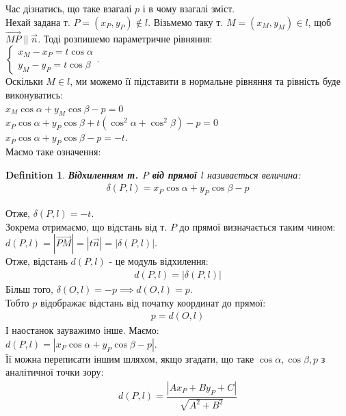 \documentclass[a4paper, 10pt]{extarticle}
\theoremstyle{theoremdd}
\theoremstyle{theoremdd}
\newtheorem{definition}[theorem]{Definition}
\theoremstyle{theoremdd}
\theoremstyle{theoremdd}
\theoremstyle{theoremdd}
\theoremstyle{theoremdd}
\theoremstyle{theoremdd}
\theoremstyle{theoremdd}
\begin{document}
Час дізнатись, що таке взагалі $p$ і в чому взагалі зміст.\\
Нехай задана т. $P = (x_P, y_P) \not \in l$. Візьмемо таку т. $M = (x_M, y_M) \in l$, щоб $\overrightarrow{MP} \parallel \vec{n}$. Тоді розпишемо параметричне рівняння:\\
$\begin{cases}
x_M - x_P = t \cos \alpha\\
y_M - y_P = t \cos \beta
\end{cases}.
$\\
Оскільки $M \in l$, ми можемо її підставити в нормальне рівняння та рівність буде виконуватись:\\
$x_M \cos \alpha + y_M \cos \beta - p = 0$\\
$x_P \cos \alpha + y_P \cos \beta + t(\cos^2 \alpha + \cos^2 \beta) - p = 0$\\
$x_P \cos \alpha + y_P \cos \beta -p = -t$.\\
Маємо таке означення:
\begin{definition}
\textbf{Відхиленням т. $P$ від прямої $l$} називається величина:
\begin{align*}
\delta(P,l) = x_P \cos \alpha + y_P \cos \beta - p
\end{align*}
\end{definition}

Отже, $\delta(P,l)=-t$.\\
Зокрема отримаємо, що відстань від т. $P$ до прямої визначається таким чином:\\
$d(P,l)=|\overrightarrow{PM}| = |t \vec{n}| = |\delta(P,l)|$.\\
Отже, відстань $d(P,l)$ - це модуль відхилення:
\begin{align*}
d(P,l) = |\delta(P,l)|
\end{align*}
Більш того, $\delta(O,l) = -p \implies d(O,l) = p$.\\
Тобто $p$ відображає відстань від початку координат до прямої:
\begin{align*}
p = d(O,l)
\end{align*}
І наостанок зауважимо інше. Маємо:\\
$d(P,l) = |x_P \cos \alpha + y_P \cos \beta - p|$.\\
Її можна переписати іншим шляхом, якщо згадати, що таке $\cos \alpha, \cos \beta, p$ з аналітичної точки зору:
\begin{align*}
d(P,l) = \dfrac{|Ax_P + By_P + C|}{\sqrt{A^2+B^2}}
\end{align*}
\end{document}
